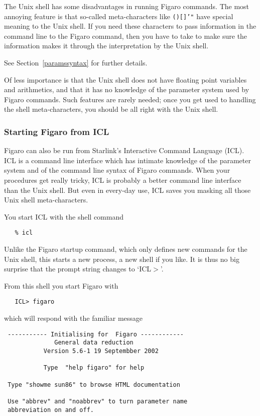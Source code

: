    The Unix shell has some disadvantages in running Figaro commands. The
   most annoying feature is that so-called meta-characters like
{\tt ()[]'"}
   have special meaning to the Unix shell. If you need these characters
   to pass information in the command line to the Figaro command, then
   you have to take
   to make sure the information makes it through the interpretation by
   the Unix shell.
\begin{latexonly}
   See Section~\ref{paramssyntax} for further details.
\end{latexonly}

   Of less importance is that the Unix shell does not have floating
   point variables and arithmetics, and that it has no knowledge of the
   parameter system used by Figaro commands. Such features are rarely
   needed; once you get used to handling the shell meta-characters,
   you should be all right with the Unix shell.

\subsubsection{Starting Figaro from ICL}

   Figaro can also be run from Starlink's Interactive Command Language
   (ICL).  ICL is a command line interface which has intimate knowledge of
   the parameter system and of the command line syntax of Figaro commands.
   When your procedures get really tricky, ICL is probably a better command
   line interface than the Unix shell.  But even in every-day use, ICL
   saves you masking all those Unix shell meta-characters.

   You start ICL with the shell command

\begin{verbatim}
   % icl
\end{verbatim}

   Unlike the Figaro startup command, which only defines new commands
   for the Unix shell, this starts a new process, a new shell if you
   like. It is thus no big surprise that the prompt string changes to
   `ICL$>$'.

   From this shell you start Figaro with

\begin{verbatim}
   ICL> figaro
\end{verbatim}

   which will respond with the familiar message

\begin{verbatim}
 ----------- Initialising for  Figaro ------------
              General data reduction
           Version 5.6-1 19 Septembber 2002
 
           Type  "help figaro" for help
 
 Type "showme sun86" to browse HTML documentation
 
 Use "abbrev" and "noabbrev" to turn parameter name
 abbreviation on and off.
\end{verbatim}

